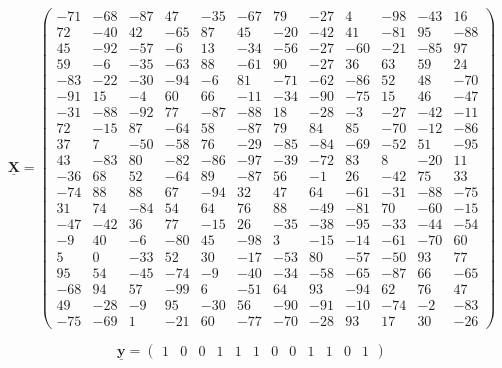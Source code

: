 \documentclass[11pt]{article}
\begin{document}
\[\underline{\textbf{X}} = \left(\begin{array}{rrrrrrrrrrrr}%
-71 & -68 & -87 &  47 & -35 & -67 &  79 & -27 &   4 & -98 & -43 &  16 \\
 72 & -40 &  42 & -65 &  87 &  45 & -20 & -42 &  41 & -81 &  95 & -88 \\
 45 & -92 & -57 &  -6 &  13 & -34 & -56 & -27 & -60 & -21 & -85 &  97 \\
 59 &  -6 & -35 & -63 &  88 & -61 &  90 & -27 &  36 &  63 &  59 &  24 \\
-83 & -22 & -30 & -94 &  -6 &  81 & -71 & -62 & -86 &  52 &  48 & -70 \\
-91 &  15 &  -4 &  60 &  66 & -11 & -34 & -90 & -75 &  15 &  46 & -47 \\
-31 & -88 & -92 &  77 & -87 & -88 &  18 & -28 &  -3 & -27 & -42 & -11 \\
 72 & -15 &  87 & -64 &  58 & -87 &  79 &  84 &  85 & -70 & -12 & -86 \\
 37 &   7 & -50 & -58 &  76 & -29 & -85 & -84 & -69 & -52 &  51 & -95 \\
 43 & -83 &  80 & -82 & -86 & -97 & -39 & -72 &  83 &   8 & -20 &  11 \\
-36 &  68 &  52 & -64 &  89 & -87 &  56 &  -1 &  26 & -42 &  75 &  33 \\
-74 &  88 &  88 &  67 & -94 &  32 &  47 &  64 & -61 & -31 & -88 & -75 \\
 31 &  74 & -84 &  54 &  64 &  76 &  88 & -49 & -81 &  70 & -60 & -15 \\
-47 & -42 &  36 &  77 & -15 &  26 & -35 & -38 & -95 & -33 & -44 & -54 \\
 -9 &  40 &  -6 & -80 &  45 & -98 &   3 & -15 & -14 & -61 & -70 &  60 \\
  5 &   0 & -33 &  52 &  30 & -17 & -53 &  80 & -57 & -50 &  93 &  77 \\
 95 &  54 & -45 & -74 &  -9 & -40 & -34 & -58 & -65 & -87 &  66 & -65 \\
-68 &  94 &  57 & -99 &   6 & -51 &  64 &  93 & -94 &  62 &  76 &  47 \\
 49 & -28 &  -9 &  95 & -30 &  56 & -90 & -91 & -10 & -74 &  -2 & -83 \\
-75 & -69 &   1 & -21 &  60 & -77 & -70 & -28 &  93 &  17 &  30 & -26
\end{array}\right)
\]

\[\underline{\textbf{y}} = \left(\begin{array}{cccccccccccc}%
1 & 0 & 0 & 1 & 1 & 1 & 0 & 0 & 1 & 1 & 0 & 1
\end{array}\right)
\]
\end{document}
